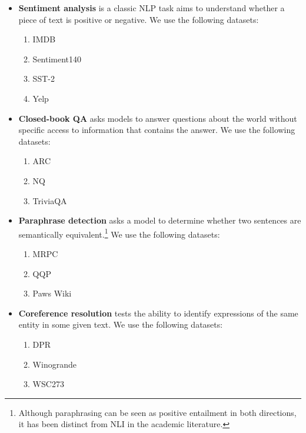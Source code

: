 \begin{itemize}[leftmargin=*]
\begin{enumerate}
    \end{enumerate}
    \item \textbf{Sentiment analysis} is a classic NLP task aims to understand whether a piece of text is positive or negative. 
    We use the following datasets:
    \begin{enumerate}
        \item IMDB \citep{maas-EtAl:2011:ACL-HLT2011}
        \item Sentiment140 \citep{go2009twitter}
        \item SST-2 \citep{socher-etal-2013-recursive}
        \item Yelp \citep{yelpdataset}
    \end{enumerate}
    \item \textbf{Closed-book QA} asks models to answer questions about the world without specific access to information that contains the answer. 
    We use the following datasets:
    \begin{enumerate}
        \item ARC \citep{clark2018think}
        \item NQ \citep{orqa,kwiatkowski2019natural}
        \item TriviaQA \cite{JoshiTriviaQA2017}
    \end{enumerate}
    \item \textbf{Paraphrase detection} asks a model to determine whether two sentences are semantically equivalent.\footnote{Although paraphrasing can be seen as positive entailment in both directions, it has been distinct from NLI in the academic literature.}
    We use the following datasets:
    \begin{enumerate}
        \item MRPC \citep{dolan-brockett-2005-automatically}
        \item QQP \citep[see]{wang-etal-2018-glue}
        \item Paws Wiki \citep{zhang-etal-2019-paws}
    \end{enumerate}
    \item \textbf{Coreference resolution} tests the ability to identify expressions of the same entity in some given text.
    We use the following datasets:
    \begin{enumerate}
        \item DPR \citep{rahman-ng-2012-resolving}
        \item Winogrande \citep{sakaguchi2020winogrande}
        \item WSC273 \citep{levesque2012winograd}

\end{enumerate}
\end{itemize}
